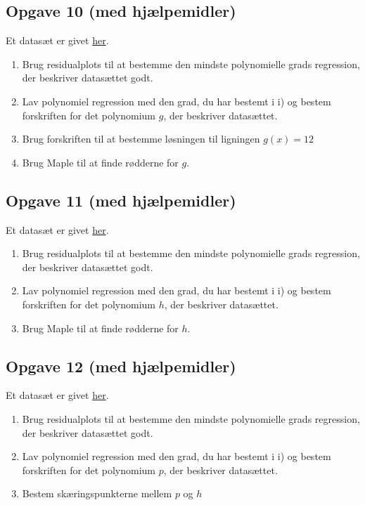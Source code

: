 \subsection*{Opgave 10 (med hjælpemidler)}
	Et datasæt er givet \href{https://github.com/ChristianJLex/TeachingNotes/raw/master/2023-2024/Data og lign/poly_opgave2.xlsx}{\color{blue!60} her}.
	\begin{enumerate}[label=\roman*)]
		\item Brug residualplots til at bestemme den mindste polynomielle grads regression, 
		der beskriver datasættet godt. 
		\item Lav polynomiel regression med den grad, du har bestemt i i) og bestem 
		forskriften for det polynomium $g$, der beskriver datasættet.
		\item Brug forskriften til at bestemme løsningen til ligningen $g(x)=12$
		\item Brug Maple til at finde rødderne for $g$.
	\end{enumerate}
	
\subsection*{Opgave 11 (med hjælpemidler)}
	Et datasæt er givet \href{https://github.com/ChristianJLex/TeachingNotes/raw/master/2023-2024/Data og lign/poly_opgave3.xlsx}{\color{blue!60} her}.
	\begin{enumerate}[label=\roman*)]
		\item Brug residualplots til at bestemme den mindste polynomielle grads regression, 
		der beskriver datasættet godt. 
		\item Lav polynomiel regression med den grad, du har bestemt i i) og bestem 
		forskriften for det polynomium $h$, der beskriver datasættet.
		\item Brug Maple til at finde rødderne for $h$.
	\end{enumerate}

\subsection*{Opgave 12 (med hjælpemidler)}
	Et datasæt er givet \href{https://github.com/ChristianJLex/TeachingNotes/raw/master/2023-2024/Data og lign/poly_opgave4.xlsx}{\color{blue!60} her}.
	\begin{enumerate}[label=\roman*)]
		\item Brug residualplots til at bestemme den mindste polynomielle grads regression, 
		der beskriver datasættet godt. 
		\item Lav polynomiel regression med den grad, du har bestemt i i) og bestem 
		forskriften for det polynomium $p$, der beskriver datasættet.
		\item Bestem skæringspunkterne mellem $p$ og $h$
	\end{enumerate}
	
